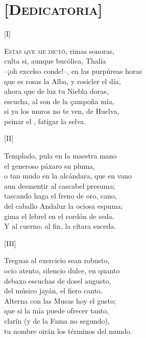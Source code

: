 \documentclass[11pt,a4paper,twoside]{article}
\newcommand{\guno}{\emph{G1}}
\begin{document}
\section*{\centering\normalsize [\textsc{Dedicatoria}]}
\vspace{-1em}
%
\begin{center}
	[I]
\end{center}
\beginnumbering
\pstart
\textsc{Estas qve me dictó}, rimas sonoras,\\
culta si, aunque bucólica, Thalía\\
--¡oh excelso conde!--, en las purpúreas horas\\
que es rosas la Alba, y rosicler el día,\\
ahora que de luz tu Niebla doras,\\
escucha, al son de la çampoña mía,\\
si ya los muros no te ven, de Huelva,\\
peinar el \edtext{viento}{\Afootnote{monte \emph{corr.} {\guno}}}, fatigar la selva.\par\pend
%
\begin{center}
	[II]
\end{center}
\pstart
Templado, pula en la maestra mano\\
el generoso páxaro su pluma,\\
o tan mudo en la alcándara, que en vano\\
aun desmentir al cascabel presuma;\\
tascando haga el freno de oro, cano,\\
del caballo Andaluz la ociosa espuma;\\
gima el lebrel en el cordón de seda.\\
Y al cuerno, al fin, la cítara suceda.\par\pend
%
\begin{center}
	[III]
\end{center}
\pstart
Treguas al exercicio sean robusto,\\
ocio atento, silencio dulce, en quanto\\
debaxo escuchas de dosel augusto,\\
del músico jayán, el fiero canto.\\
Alterna con las Musas hoy el gusto;\\
que si la mía puede ofrecer tanto,\\
clarín (y de la Fama no segundo),\\
tu nombre oirán los términos del mundo.\par\pend
%
\end{document}
